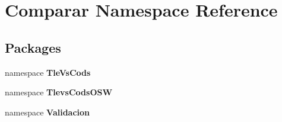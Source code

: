 \section{\-Comparar \-Namespace \-Reference}
\label{namespace_comparar}
\subsection*{\-Packages}
\begin{DoxyCompactItemize}
\item 
namespace {\bf \-Tle\-Vs\-Cods}
\item 
namespace {\bf \-Tlevs\-Cods\-O\-S\-W}
\item 
namespace {\bf \-Validacion}
\end{DoxyCompactItemize}
